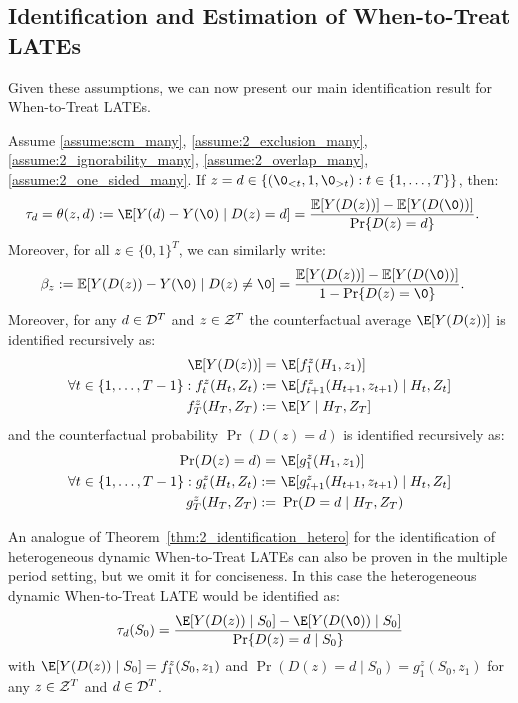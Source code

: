 \subsection{Identification and Estimation of When-to-Treat LATEs}\label{sec:dml_many}

Given these assumptions, we can now present our main identification result for When-to-Treat LATEs.
\begin{theorem}\label{thm:2_identification_many}
Assume
 \ref{assume:scm_many}, 
 \ref{assume:2_exclusion_many},
 \ref{assume:2_ignorability_many}, \ref{assume:2_overlap_many}, \ref{assume:2_one_sided_many}.
If $z=d\in\{(\0_{<t},1,\0_{>t}): t\in \{1, \ldots, T\}\}$, then: 
\begin{align*}
\tau_d = \theta(z,d) := \E[Y(d) - Y(\0) &\mid D(z)=d]
 =\frac{
    \mathbb{E}[Y(D(z)) ]
    - \mathbb{E}[Y(D(\0)) ]
  }{\Pr\{ D(z)=d \}
  }.
\end{align*}
Moreover, for all $z \in \{0,1\}^T$, we can similarly write: 
\begin{align*}
\beta_z := \mathbb{E}[Y(D(z)) - Y(\0) &\mid D(z) \neq \0]
 =\frac{
    \mathbb{E}[ Y(D(z)) ]
    - \mathbb{E}[ Y(D(\0)) ]
  }{1 - \Pr\{ D(z)=\0 \}
  }.
\end{align*}
Moreover, for any $d\in {\cal D}^T$ and $z\in {\cal Z}^T$ the counterfactual average $\E[Y(D(z))]$ is identified recursively as: 
\begin{align*}
\E[Y(D(z))]
=~&\E[f_1^{z}(H_1, z_1)]\\
\forall t\in \{1,\ldots, T-1\}: f_t^z(H_t, Z_t) :=~& \E[f_{t+1}^z(H_{t+1}, z_{t+1})\mid H_t, Z_t]\\
f_{T}^z(H_T, Z_T) :=~& \E[Y\mid H_T, Z_T]
\end{align*}
and the counterfactual probability $\Pr(D(z)=d)$ is identified recursively as:
\begin{align*}
\Pr(D(z)=d)
=~& \E[g_1^z(H_1, z_1)]\\
\forall t\in \{1,\ldots, T-1\}: g_t^z(H_t, Z_t) :=~& \E[g_{t+1}^z(H_{t+1}, z_{t+1})\mid H_t, Z_t]\\
g_{T}^z(H_T, Z_T) :=~& \Pr(D=d\mid H_T, Z_T)
\end{align*}
\end{theorem}
An analogue of Theorem~\ref{thm:2_identification_hetero} for the identification of heterogeneous dynamic When-to-Treat LATEs can also be proven in the multiple period setting, but we omit it for conciseness. In this case the heterogeneous dynamic When-to-Treat LATE would be identified as:
\begin{align}
    \tau_d(S_0) = \frac{\E[Y(D(z))\mid S_0] - \E[Y(D(\0))\mid S_0]}{\Pr\{D(z)=d\mid S_0\}}
\end{align}
with $\E[Y(D(z))\mid S_0] = f_1^z(S_0, z_1)$ and $\Pr(D(z)=d\mid S_0)=g_1^z(S_0, z_1)$ for any $z\in {\cal Z}^T$ and $d\in {\cal D}^T$.


